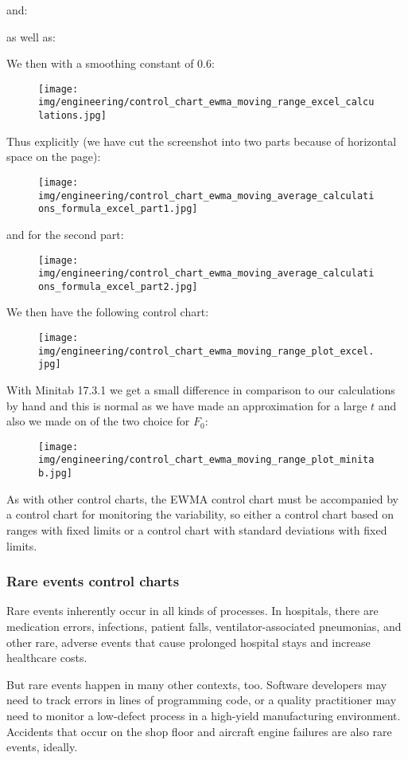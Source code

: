 	and:
	
	as well as:
	
	We then with a smoothing constant of $0.6$:
	\begin{figure}[H]
		\centering
		\texttt{[image: img/engineering/control\_chart\_ewma\_moving\_range\_excel\_calculations.jpg]}
	\end{figure}
	Thus explicitly (we have cut the screenshot into two parts because of horizontal space on the page):
	\begin{figure}[H]
		\centering
		\texttt{[image: img/engineering/control\_chart\_ewma\_moving\_average\_calculations\_formula\_excel\_part1.jpg]}
	\end{figure}
	and for the second part:
	\begin{figure}[H]
		\centering
		\texttt{[image: img/engineering/control\_chart\_ewma\_moving\_average\_calculations\_formula\_excel\_part2.jpg]}
	\end{figure}
	We then have the following control chart:
	\begin{figure}[H]
		\centering
		\texttt{[image: img/engineering/control\_chart\_ewma\_moving\_range\_plot\_excel.jpg]}
	\end{figure}
	With Minitab 17.3.1 we get a small difference in comparison to our calculations by hand and this is normal as we have made an approximation for a large $t$ and also we made on of the two choice for $F_0$:
	\begin{figure}[H]
		\centering
		\texttt{[image: img/engineering/control\_chart\_ewma\_moving\_range\_plot\_minitab.jpg]}
	\end{figure}
	As with other control charts, the EWMA control chart must be accompanied by a control chart for monitoring the variability, so either a control chart based on ranges with fixed limits or a control chart with standard deviations with fixed limits.
	
	\subsubsection{Rare events control charts}
	Rare events inherently occur in all kinds of processes. In hospitals, there are medication errors, infections, patient falls, ventilator-associated pneumonias, and other rare, adverse events that cause prolonged hospital stays and increase healthcare costs. 

	But rare events happen in many other contexts, too. Software developers may need to track errors in lines of programming code, or a quality practitioner may need to monitor a low-defect process in a high-yield manufacturing environment. Accidents that occur on the shop floor and aircraft engine failures are also rare events, ideally.

